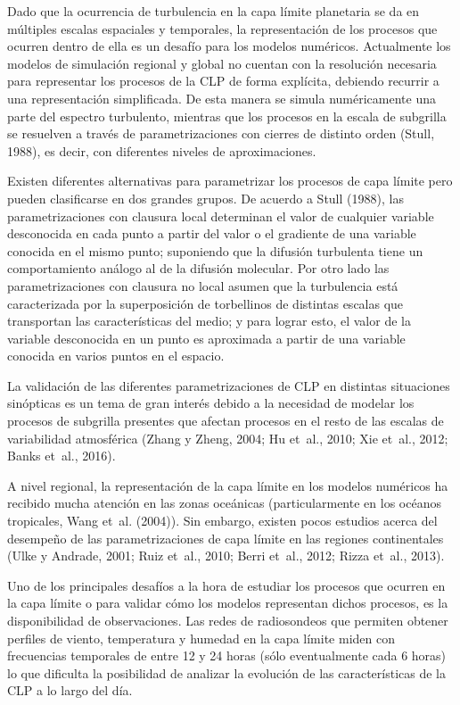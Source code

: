 \documentclass[12pt,spanish,oneside, a4paper]{book}
\begin{document}
Dado que la ocurrencia de turbulencia en la capa límite planetaria se da
en múltiples escalas espaciales y temporales, la representación de los
procesos que ocurren dentro de ella es un desafío para los modelos
numéricos. Actualmente los modelos de simulación regional y global no
cuentan con la resolución necesaria para representar los procesos de la
CLP de forma explícita, debiendo recurrir a una representación
simplificada. De esta manera se simula numéricamente una parte del
espectro turbulento, mientras que los procesos en la escala de subgrilla
se resuelven a través de parametrizaciones con cierres de distinto orden
(Stull, 1988), es decir, con diferentes niveles de aproximaciones.

Existen diferentes alternativas para parametrizar los procesos de capa
límite pero pueden clasificarse en dos grandes grupos. De acuerdo a
Stull (1988), las parametrizaciones con clausura local determinan el
valor de cualquier variable desconocida en cada punto a partir del valor
o el gradiente de una variable conocida en el mismo punto; suponiendo
que la difusión turbulenta tiene un comportamiento análogo al de la
difusión molecular. Por otro lado las parametrizaciones con clausura no
local asumen que la turbulencia está caracterizada por la superposición
de torbellinos de distintas escalas que transportan las características
del medio; y para lograr esto, el valor de la variable desconocida en un
punto es aproximada a partir de una variable conocida en varios puntos
en el espacio.

La validación de las diferentes parametrizaciones de CLP en distintas
situaciones sinópticas es un tema de gran interés debido a la necesidad
de modelar los procesos de subgrilla presentes que afectan procesos en
el resto de las escalas de variabilidad atmosférica (Zhang y Zheng,
2004; Hu et~al., 2010; Xie et~al., 2012; Banks et~al., 2016).

A nivel regional, la representación de la capa límite en los modelos
numéricos ha recibido mucha atención en las zonas oceánicas
(particularmente en los océanos tropicales, Wang et~al. (2004)). Sin
embargo, existen pocos estudios acerca del desempeño de las
parametrizaciones de capa límite en las regiones continentales (Ulke y
Andrade, 2001; Ruiz et~al., 2010; Berri et~al., 2012; Rizza et~al.,
2013).

Uno de los principales desafíos a la hora de estudiar los procesos que
ocurren en la capa límite o para validar cómo los modelos representan
dichos procesos, es la disponibilidad de observaciones. Las redes de
radiosondeos que permiten obtener perfiles de viento, temperatura y
humedad en la capa límite miden con frecuencias temporales de entre 12 y
24 horas (sólo eventualmente cada 6 horas) lo que dificulta la
posibilidad de analizar la evolución de las características de la CLP a
lo largo del día.
\end{document}
